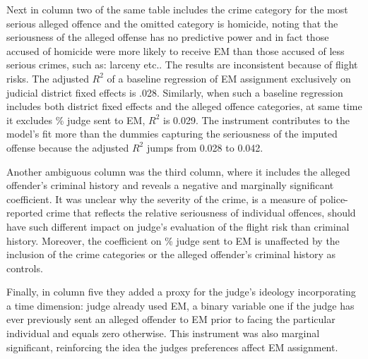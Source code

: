 \documentclass[a4paper,12pt]{article}
\begin{document}
Next in column two of the same table includes the crime category for the most serious alleged offence and the omitted category is homicide, noting that the seriousness of the alleged offense has no predictive power and in fact those accused of homicide were more likely to receive EM than those accused of less serious crimes, such as: larceny etc.. The results are inconsistent because of flight risks. The adjusted $R^2$ of a baseline regression of EM assignment exclusively on judicial district fixed effects is .028. Similarly, when such a baseline regression includes both district fixed effects and the alleged offence categories, at same time it excludes \% judge sent to EM, $R^2$ is 0.029. The instrument contributes to the model's fit more than the dummies capturing the seriousness of the imputed offense because the adjusted $R^2$ jumps from 0.028 to 0.042.  

Another ambiguous column was the third column, where it includes the alleged offender's criminal history and reveals a negative and marginally significant coefficient. It was unclear why the severity of the crime, is a measure of police-reported crime that reflects the relative seriousness of individual offences, should have such different impact on judge's evaluation of the flight risk than criminal history. Moreover, the coefficient on \% judge sent to EM is unaffected by the inclusion of the crime categories or the alleged offender's criminal history as controls. 

Finally, in column five they added a proxy for the judge's ideology incorporating a time dimension: judge already used EM, a binary variable one if the judge has ever previously sent an alleged offender to EM prior to facing the particular individual and equals zero otherwise. This instrument was also marginal significant, reinforcing the idea the judges preferences affect EM assignment.  

\end{document}
